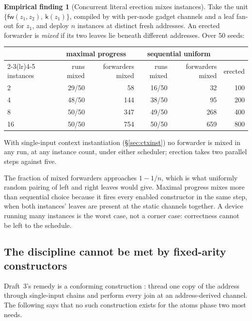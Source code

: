 \documentclass[11pt,a4paper]{article}
\theoremstyle{plain}
\theoremstyle{definition}
\newtheorem{finding}[theorem]{Empirical finding}
\theoremstyle{remark}
\newcommand{\kk}{\mathsf{k}}
\newcommand{\fw}{\mathsf{fw}}
\begin{document}
\begin{finding}[Concurrent literal erection mixes instances]
\label{find:mix}
Take the unit $\{\fw(z_{1},z_{2}),\ \kk(z_{1})\}$, compiled by
\cite[Def.~6.8]{rhocomb3} with per-node gadget channels and a leaf fan-out for
$z_{1}$, and deploy $n$ instances at distinct fresh addresses. An erected
forwarder is \emph{mixed} if its two leaves lie beneath different addresses.
Over 50 seeds:
\begin{center}\small
\begin{tabular}{@{}lrrrrr@{}}
\toprule
& \multicolumn{2}{c}{maximal progress} & \multicolumn{2}{c}{sequential uniform} & \\
\cmidrule(lr){2-3}\cmidrule(lr){4-5}
instances & runs mixed & forwarders mixed & runs mixed & forwarders mixed & erected\\
\midrule
2  & 29/50 & 58  & 16/50 & 32  & 100\\
4  & 48/50 & 144 & 38/50 & 95  & 200\\
8  & 50/50 & 347 & 49/50 & 268 & 400\\
16 & 50/50 & 754 & 50/50 & 659 & 800\\
\bottomrule
\end{tabular}
\end{center}
With single-input context instantiation (\S\ref{sec:ctxinst}) no forwarder is
mixed in any run, at any instance count, under either scheduler; erection
takes two parallel steps against five.
\end{finding}

The fraction of mixed forwarders approaches $1 - 1/n$, which is what uniformly
random pairing of left and right leaves would give. Maximal progress mixes
more than sequential choice because it fires every enabled constructor in the
same step, when both instances' leaves are present at the static channels
together. A device running many instances is the worst case, not a corner
case: correctness cannot be left to the schedule.

\subsection{The discipline cannot be met by fixed-arity constructors}

Draft~3's remedy is a conforming construction \cite[Rem.~6.12]{rhocomb3}:
thread one copy of the address through single-input chains and perform every
join at an address-derived channel. The following says that no such
construction exists for the atoms phase two most needs.
\end{document}
